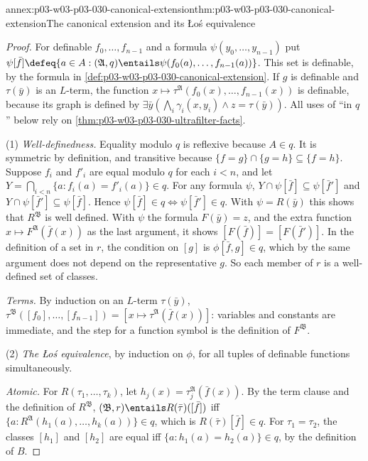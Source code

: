 \begin{annexitem}{annex:p03-w03-p03-030-canonical-extension}{thm:p03-w03-p03-030-canonical-extension}{The canonical extension and its \L o\'s equivalence}
\begin{proof}
For definable \(f_0,\ldots,f_{n-1}\) and a formula \(\psi(y_0,\ldots,y_{n-1})\)
put \(\psi[\bar f]\defeq\{a\in A:(\mathfrak A,q)\entails\psi(f_0(a),\ldots,
f_{n-1}(a))\}\).  This set is definable, by the formula in
\cref{def:p03-w03-p03-030-canonical-extension}.  If \(g\) is definable and
\(\tau(\bar y)\) is an \(L\)-term, the function
\(x\mapsto\tau^{\mathfrak A}(f_0(x),\ldots,f_{n-1}(x))\) is definable,
because its graph is defined by \(\exists\bar y(\bigwedge_i\gamma_i(x,y_i)\wedge
z=\tau(\bar y))\).  All uses of ``in \(q\)'' below rely on
\cref{thm:p03-w03-p03-030-ultrafilter-facts}.

(1) \emph{Well-definedness.}  Equality modulo \(q\) is reflexive because
\(A\in q\).  It is symmetric by definition, and transitive because
\(\{f=g\}\cap\{g=h\}\subseteq\{f=h\}\).  Suppose \(f_i\) and \(f'_i\) are
equal modulo \(q\) for each \(i<n\), and let \(Y=\bigcap_{i<n}\{a:f_i(a)=
f'_i(a)\}\in q\).  For any formula \(\psi\),
\(Y\cap\psi[\bar f]\subseteq\psi[\bar f']\) and
\(Y\cap\psi[\bar f']\subseteq\psi[\bar f]\).  Hence
\(\psi[\bar f]\in q\iff\psi[\bar f']\in q\).  With \(\psi=R(\bar y)\) this
shows that \(R^{\mathfrak B}\) is well defined.  With \(\psi\) the formula
\(F(\bar y)=z\), and the extra function \(x\mapsto F^{\mathfrak A}(\bar
f(x))\) as the last argument, it shows \([F(\bar f)]=[F(\bar f')]\).  In the
definition of a set in \(r\), the condition on \([g]\) is
\(\phi[\bar f,g]\in q\), which by the same argument does not depend on the
representative \(g\).  So each member of \(r\) is a well-defined set of
classes.

\emph{Terms.}  By induction on an \(L\)-term \(\tau(\bar y)\),
\(\tau^{\mathfrak B}([f_0],\ldots,[f_{n-1}])=[x\mapsto\tau^{\mathfrak A}(\bar
f(x))]\): variables and constants are immediate, and the step for a
function symbol is the definition of \(F^{\mathfrak B}\).

(2) \emph{The \L o\'s equivalence}, by induction on \(\phi\), for all tuples
of definable functions simultaneously.

\emph{Atomic.}  For \(R(\tau_1,\ldots,\tau_k)\), let
\(h_j(x)=\tau_j^{\mathfrak A}(\bar f(x))\).  By the term clause and the
definition of \(R^{\mathfrak B}\), \((\mathfrak B,r)\entails
R(\bar\tau)([\bar f])\) iff \(\{a:R^{\mathfrak A}(h_1(a),\ldots,h_k(a))\}\in
q\), which is \(R(\bar\tau)[\bar f]\in q\).  For \(\tau_1=\tau_2\), the classes
\([h_1]\) and \([h_2]\) are equal iff \(\{a:h_1(a)=h_2(a)\}\in q\), by the
definition of \(B\).


\end{proof}
\end{annexitem}
